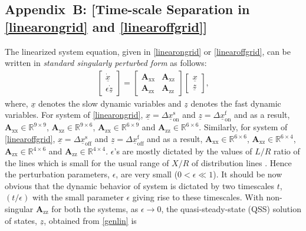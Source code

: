 \documentclass[journal]{IEEEtran}
\begin{document}
\subsection*{Appendix~B: [Time-scale Separation in \eqref{linearongrid} and \eqref{linearoffgrid}]}
The linearized system equation, given in \eqref{linearongrid} or \eqref{linearoffgrid}, can be written in \textit{standard singularly perturbed form} as follows:
\begin{align}\label{genlin}
 \begin{bmatrix}
  \dot{\underline{x}} \\ \epsilon\dot{\underline{z}} \end{bmatrix}
  =
  \begin{bmatrix}\mathbf{A}_\mathrm{xx} & \mathbf{A}_\mathrm{xz} \\ \mathbf{A}_\mathrm{zx} & \mathbf{A}_\mathrm{zz}
 \end{bmatrix}
  \begin{bmatrix}
  {\underline{x}} \\ {\underline{z}} \end{bmatrix},
\end{align}
where, $\underline{x}$ denotes the slow dynamic variables and $\underline{z}$ denotes the fast dynamic variables. For system of \eqref{linearongrid}, $\underline{x}=\Delta \underline{x}_\mathrm{on}^\mathrm{s}$ and $\underline{z}=\Delta \underline{x}_\mathrm{on}^\mathrm{f}$ and as a result, $\mathbf{A}_\mathrm{xx}\in \mathbb{R}^{9\times 9}$, $\mathbf{A}_\mathrm{xz}\in \mathbb{R}^{9\times 6}$, $\mathbf{A}_\mathrm{zx}\in \mathbb{R}^{6\times 9}$ and $\mathbf{A}_\mathrm{zz}\in \mathbb{R}^{6\times 6}$. Similarly, for system of \eqref{linearoffgrid}, $\underline{x}=\Delta \underline{x}_\mathrm{off}^\mathrm{s}$ and $\underline{z}=\Delta \underline{x}_\mathrm{off}^\mathrm{f}$ and as a result, $\mathbf{A}_\mathrm{xx}\in \mathbb{R}^{6\times 6}$, $\mathbf{A}_\mathrm{xz}\in \mathbb{R}^{6\times 4}$, $\mathbf{A}_\mathrm{zx}\in \mathbb{R}^{4\times 6}$ and $\mathbf{A}_\mathrm{zz}\in \mathbb{R}^{4\times 4}$. $\epsilon$'s are mostly dictated by the values of $L/R$ ratio of the lines which is small for the usual range of $X/R$ of distribution lines \cite{kundur}. Hence the perturbation parameters, $\epsilon$, are very small ($0 < \epsilon \ll 1$). It should be now obvious that the dynamic behavior of system is dictated by two timescales $t$, $(t/\epsilon)$ with the small parameter $\epsilon$ giving rise to these timescales. With non-singular $\mathbf{A}_\mathrm{zz}$ for both the systems, as $\epsilon \to 0$, the quasi-steady-state (QSS) solution of states, $\underline{z}$, obtained from \eqref{genlin} is
\end{document}
